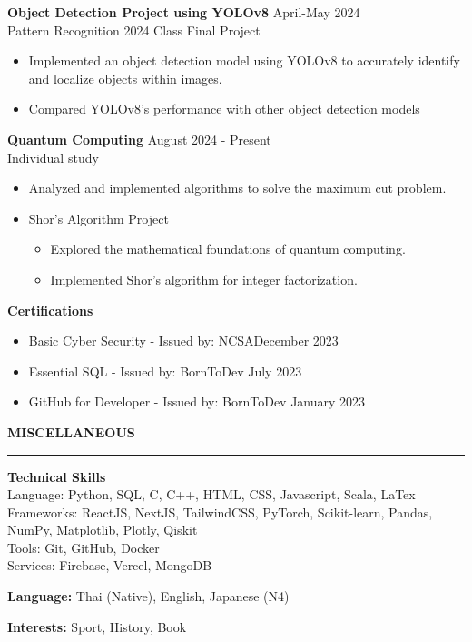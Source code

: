 \documentclass[11pt]{article}
\begin{document}
\textbf{Object Detection Project using YOLOv8} \hfill April-May 2024 \\
{\footnotesize Pattern Recognition 2024 Class Final Project}
\begin{itemize}[noitemsep, topsep=0pt, partopsep=0pt, parsep=0pt]
    \item Implemented an object detection model using YOLOv8 to accurately identify and localize objects within images.
    \item Compared YOLOv8's performance with other object detection models
\end{itemize}

\textbf{Quantum Computing} \hfill August 2024 - Present\\
{\footnotesize Individual study}
\begin{itemize}[noitemsep, topsep=0pt, partopsep=0pt, parsep=0pt]
    \item Analyzed and implemented algorithms to solve the maximum cut problem.
    \item Shor's Algorithm Project
    {\fontsize{10pt}{11pt}\selectfont
    \begin{itemize}[noitemsep, topsep=0pt, partopsep=0pt, parsep=0pt, leftmargin=*]
        \item Explored the mathematical foundations of quantum computing.
        \item Implemented Shor's algorithm for integer factorization.
    \end{itemize}
    }
\end{itemize}

\textbf{Certifications}
\begin{itemize}[noitemsep, topsep=0pt, partopsep=0pt, parsep=0pt]
    \item {Basic Cyber Security} - Issued by: NCSA\hfill December 2023
    \item {Essential SQL} - Issued by: BornToDev \hfill July 2023
    \item {GitHub for Developer} - Issued by: BornToDev \hfill January 2023
\end{itemize}
\vspace{9pt}
\textbf{MISCELLANEOUS}
\vspace{5pt}
{\color{NavyBlue}\hrule}
\vspace{6pt}

\textbf{Technical Skills}\\
\hspace*{7pt} Language: Python, SQL, C, C++, HTML, CSS, Javascript, Scala, LaTex\\
\hspace*{7pt} Frameworks: ReactJS, NextJS, TailwindCSS, PyTorch, Scikit-learn, Pandas, NumPy, Matplotlib, Plotly, Qiskit\\
\hspace*{7pt} Tools: Git, GitHub, Docker\\
\hspace*{7pt} Services: Firebase, Vercel, MongoDB

\textbf{Language:} Thai (Native), English, Japanese (N4)

\textbf{Interests:} Sport, History, Book
\end{document}
